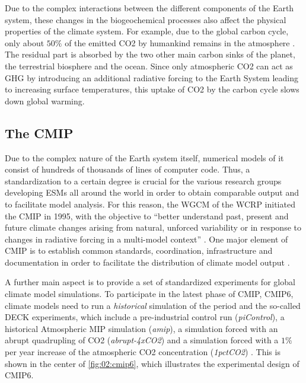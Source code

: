 Due to the complex interactions between the different components of the Earth
system, these changes in the biogeochemical processes also affect the physical
properties of the climate system. For example, due to the global carbon cycle,
only about $50 \unit{\%}$ of the emitted \ac{CO2} by humankind remains in the
atmosphere \autocite{Friedlingstein2019}. The residual part is absorbed by the
two other main carbon sinks of the planet, the terrestrial biosphere and the
ocean. Since only atmospheric \ac{CO2} can act as \ac{GHG} by introducing an
additional radiative forcing to the Earth System leading to increasing surface
temperatures, this uptake of \ac{CO2} by the carbon cycle slows down global
warming.


\subsection{The \acf{CMIP}}
\label{subsec:02:cmip}

Due to the complex nature of the Earth system itself, numerical models of it
consist of hundreds of thousands of lines of computer code. Thus, a
standardization to a certain degree is crucial for the various research groups
developing \acp{ESM} all around the world in order to obtain comparable output
and to facilitate model analysis. For this reason, the \ac{WGCM} of the
\ac{WCRP} initiated the \acf{CMIP} in 1995, with the objective to
\enquote{better understand past, present and future climate changes arising
  from natural, unforced variability or in response to changes in radiative
  forcing in a multi-model context} \autocite{WCRP2020}. One major element of
\ac{CMIP} is to establish common standards, coordination, infrastructure and
documentation in order to facilitate the distribution of climate model output
\autocite{Eyring2016, Juckes2020}.

A further main aspect is to provide a set of standardized experiments for
global climate model simulations. To participate in the latest phase of
\ac{CMIP}, \acs{CMIP}6, climate models need to run a \emph{historical}
simulation of the period  and the so-called \ac{DECK}
experiments, which include a pre-industrial control run (\emph{piControl}), a
historical Atmospheric \ac{MIP} simulation (\emph{amip}), a simulation forced
with an abrupt quadrupling of \ac{CO2} (\emph{abrupt-4xCO2}) and a simulation
forced with a $1 \unit{\%}$ per year increase of the atmospheric \ac{CO2}
concentration (\emph{1pctCO2}) \autocite{Eyring2016}. This is shown in the
center of \cref{fig:02:cmip6}, which illustrates the experimental design of
\acs{CMIP}6.

